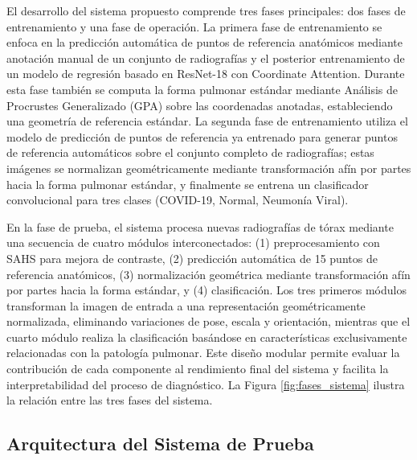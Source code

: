 El desarrollo del sistema propuesto comprende tres fases principales: dos fases de entrenamiento y una fase de operación. La primera fase de entrenamiento se enfoca en la predicción 
  automática de puntos de referencia anatómicos mediante anotación manual de un conjunto de radiografías y el posterior entrenamiento de un modelo de regresión basado en ResNet-18 con 
  Coordinate Attention. Durante esta fase también se computa la forma pulmonar estándar mediante Análisis de Procrustes Generalizado (GPA) sobre las coordenadas anotadas, estableciendo
   una geometría de referencia estándar. La segunda fase de entrenamiento utiliza el modelo de predicción de puntos de referencia ya entrenado para generar puntos de referencia automáticos sobre 
  el conjunto completo de radiografías; estas imágenes se normalizan geométricamente mediante transformación afín por partes hacia la forma pulmonar estándar, y finalmente se entrena  
  un clasificador convolucional para tres clases (COVID-19, Normal, Neumonía Viral).                                                                                         
                                                                                                                                                                                        
  En la fase de prueba, el sistema procesa nuevas radiografías de tórax mediante una secuencia de cuatro módulos interconectados: (1) preprocesamiento con SAHS para mejora de      
  contraste, (2) predicción automática de 15 puntos de referencia anatómicos, (3) normalización geométrica mediante transformación afín por partes hacia la forma estándar, y (4)       
  clasificación. Los tres primeros módulos transforman la imagen de entrada a una representación geométricamente normalizada, eliminando variaciones de pose, escala y      
  orientación, mientras que el cuarto módulo realiza la clasificación basándose en características exclusivamente relacionadas con la patología pulmonar. Este diseño   
  modular permite evaluar la contribución de cada componente al rendimiento final del sistema y facilita la interpretabilidad del proceso de diagnóstico.
La Figura \ref{fig:fases_sistema} ilustra la relación entre las tres fases del sistema.

\subsection{Arquitectura del Sistema de Prueba}
\label{subsec:arquitectura_sistema}

